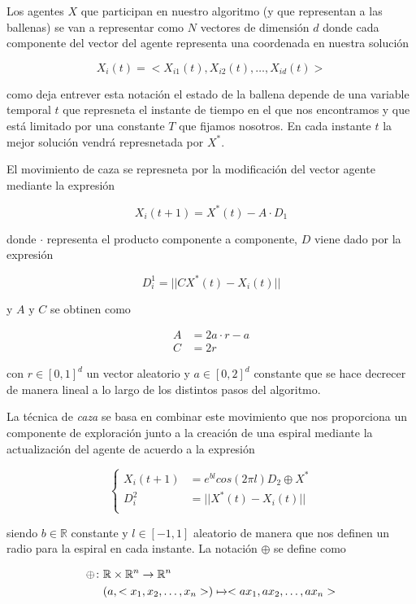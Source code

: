 \documentclass[a4paper,11pt]{article}
\begin{document}
Los agentes $X$ que participan en nuestro algoritmo (y que representan a las
ballenas) se van a representar como $N$ vectores de dimensión $d$ donde cada
componente del vector del agente representa una coordenada en nuestra solución

\[
    X_i(t) = <X_{i1}(t), X_{i2}(t), \dots, X_{id}(t)>
\]

como deja entrever esta notación el estado de la ballena depende de una variable 
temporal $t$ que represneta el instante de tiempo en el que nos encontramos y 
que está limitado por una constante $T$ que fijamos nosotros. En cada instante 
$t$ la mejor solución vendrá represnetada por $X^*$.

El movimiento de caza se represneta por la modificación del vector agente
mediante la expresión

\[
    X_i(t+1) = X^*(t) - A\cdot D_1   
\]

donde $\cdot$ representa el producto componente a componente, $D$ viene dado por
la expresión

\[
    D^1_i = ||CX^*(t)-X_i(t)||    
\]

y $A \text{ y } C$ se obtinen como 

\begin{align*}
    A &= 2a\cdot r - a \\
    C &= 2r
\end{align*}

con $r \in [0,1]^d$ un vector aleatorio y $a\in [0,2]^d$ constante que se hace
decrecer de manera lineal a lo largo de los distintos pasos del algoritmo.

La técnica de \textit{caza} se basa en combinar este movimiento que nos
proporciona un componente de exploración junto a la creación de una espiral 
mediante la actualización del agente de acuerdo a la expresión 

\[
\begin{cases}
    X_i(t+1) &= e^{bl}cos(2\pi l)D_2 \oplus X^* \\     
    D^2_i &= ||X^*(t)-X_i(t)||\\
\end{cases}
\]

siendo $b \in \mathbb{R}$ constante y $l \in [-1,1]$ aleatorio de manera que
nos definen un radio para la espiral en cada instante. La notación $\oplus$ 
se define como 

\begin{align*}
    \oplus\colon & \mathbb{R}\times\mathbb{R}^n \to \mathbb{R}^n\\
    & (a, <x_1, x_2, \dots, x_n>) \xmapsto{}<ax_1, ax_2, \dots, ax_n>
\end{align*}
\end{document}
